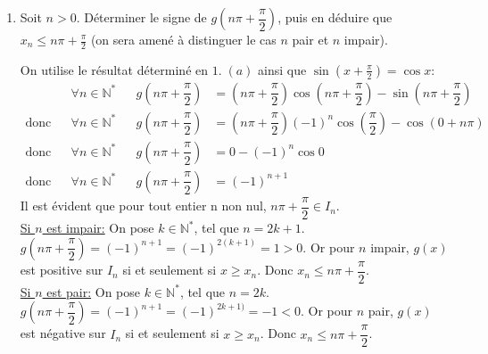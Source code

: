 \documentclass[a4paper,french,bookmarks]{article}
\begin{document}
\begin{enumerate}
\begin{enumerate}
    \item Soit $n > 0$. Déterminer le signe de $g\left(n\pi + \dfrac{\pi}{2}\right)$, puis en déduire que $x_n \leq n\pi + \frac{\pi}{2}$ (on sera amené à distinguer le cas $n$ pair et $n$ impair).
        \begin{tcolorbox}[colback=black!3,colframe=black!9,boxrule=.25pt,enhanced,arc is angular,arc=0pt]
        On utilise le résultat déterminé en $1. \; (a)$ ainsi que $\sin\left(x+\frac{\pi}{2}\right) = \cos x$:
        \begin{align*}
            && \forall n \in \mathbb{N}^* && g\left(n\pi+\dfrac{\pi}{2}\right) &= \left(n\pi+\dfrac{\pi}{2}\right) \cos\left(n\pi+\dfrac{\pi}{2}\right) - \sin\left(n\pi+\dfrac{\pi}{2}\right)\\
    \text{donc} && \forall n \in \mathbb{N}^* && g\left(n\pi+\dfrac{\pi}{2}\right) &= \left(n\pi+\dfrac{\pi}{2}\right)(-1)^n\cos\left(\dfrac{\pi}{2}\right) - \cos\left(0 + n\pi\right)\\
     \text{donc} && \forall n \in \mathbb{N}^* && g\left(n\pi+\dfrac{\pi}{2}\right) &= 0 - (-1)^n\cos 0\\
      \text{donc} && \forall n \in \mathbb{N}^* && g\left(n\pi+\dfrac{\pi}{2}\right) &= (-1)^{n+1}
        \end{align*}
        Il est évident que pour tout entier n non nul, $n\pi + \dfrac{\pi}{2} \in I_n$.\\
        \underline{Si $n$ est impair:} On pose $k \in \mathbb{N}^*$, tel que $n=2k+1$.\\
        $g\left(n\pi+\dfrac{\pi}{2}\right) = (-1)^{n+1} = (-1)^{2(k+1)} = 1 > 0$. Or pour $n$ impair, $g(x)$ est positive sur $I_n$ si et seulement si $x \geq x_n$. Donc $x_n \leq n\pi + \dfrac{\pi}{2}$.\\
        
        \underline{Si $n$ est pair:} On pose $k \in \mathbb{N}^*$, tel que $n=2k$.\\
        $g\left(n\pi+\dfrac{\pi}{2}\right) = (-1)^{n+1} = (-1)^{2k+1)} = -1 < 0$. Or pour $n$ pair, $g(x)$ est négative sur $I_n$ si et seulement si $x \geq x_n$. Donc $x_n \leq n\pi + \dfrac{\pi}{2}$.
        

\end{tcolorbox}
\end{enumerate}
\end{enumerate}
\end{document}
